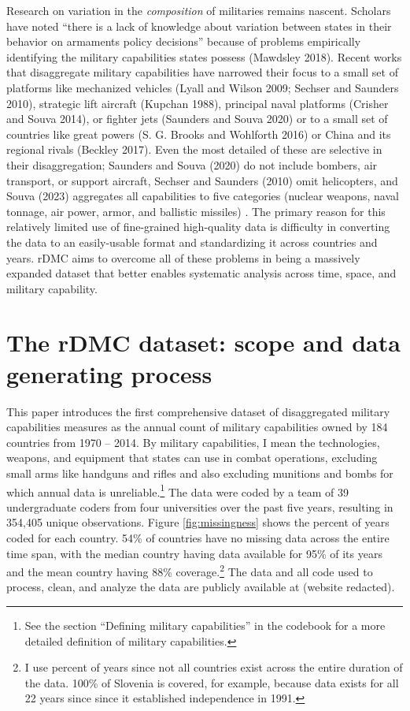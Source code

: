 \documentclass[
]{article}
\begin{document}
Research on variation in the \emph{composition} of militaries remains nascent. Scholars have noted ``there is a lack of knowledge about variation between states in their behavior on armaments policy decisions'' because of problems empirically identifying the military capabilities states possess (Mawdsley 2018). Recent works that disaggregate military capabilities have narrowed their focus to a small set of platforms like mechanized vehicles (Lyall and Wilson 2009; Sechser and Saunders 2010), strategic lift aircraft (Kupchan 1988), principal naval platforms (Crisher and Souva 2014), or fighter jets (Saunders and Souva 2020) or to a small set of countries like great powers (S. G. Brooks and Wohlforth 2016) or China and its regional rivals (Beckley 2017). Even the most detailed of these are selective in their disaggregation; Saunders and Souva (2020) do not include bombers, air transport, or support aircraft, Sechser and Saunders (2010) omit helicopters, and Souva (2023) aggregates all capabilities to five categories (nuclear weapons, naval tonnage, air power, armor, and ballistic missiles) . The primary reason for this relatively limited use of fine-grained high-quality data is difficulty in converting the data to an easily-usable format and standardizing it across countries and years. rDMC aims to overcome all of these problems in being a massively expanded dataset that better enables systematic analysis across time, space, and military capability.

\hypertarget{the-rdmc-dataset-scope-and-data-generating-process}{%
\section{The rDMC dataset: scope and data generating process}\label{the-rdmc-dataset-scope-and-data-generating-process}}

This paper introduces the first comprehensive dataset of disaggregated military capabilities measures as the annual count of military capabilities owned by 184 countries from 1970 -- 2014. By military capabilities, I mean the technologies, weapons, and equipment that states can use in combat operations, excluding small arms like handguns and rifles and also excluding munitions and bombs for which annual data is unreliable.\footnote{See the section ``Defining military capabilities'' in the codebook for a more detailed definition of military capabilities.} The data were coded by a team of 39 undergraduate coders from four universities over the past five years, resulting in 354,405 unique observations. Figure \ref{fig:missingness} shows the percent of years coded for each country. 54\% of countries have no missing data across the entire time span, with the median country having data available for 95\% of its years and the mean country having 88\% coverage.\footnote{I use percent of years since not all countries exist across the entire duration of the data. 100\% of Slovenia is covered, for example, because data exists for all 22 years since since it established independence in 1991.} The data and all code used to process, clean, and analyze the data are publicly available at (website redacted).
\end{document}
